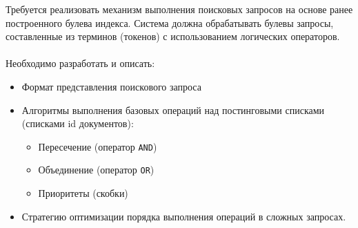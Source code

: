 
Требуется реализовать механизм выполнения поисковых запросов на основе ранее построенного булева индекса. Система должна обрабатывать булевы запросы, составленные из терминов (токенов) с использованием логических операторов.
\\ \\
Необходимо разработать и описать:
\begin{itemize}
    \item Формат представления поискового запроса
    \item Алгоритмы выполнения базовых операций над постинговыми списками (списками id документов):
    \begin{itemize}
        \item Пересечение (оператор \texttt{AND})
        \item Объединение (оператор \texttt{OR})
        \item Приоритеты (скобки)
    \end{itemize}
    \item Стратегию оптимизации порядка выполнения операций в сложных запросах.
\end{itemize}

\pagebreak

